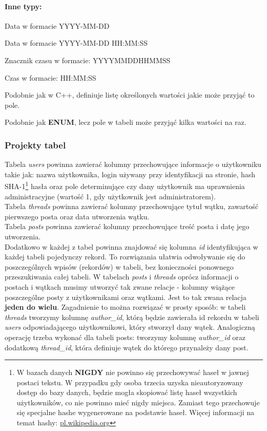 \documentclass[a4paper,10pt]{article}
\renewenvironment{description}[1][0pt]
	{\list{}{\labelwidth=0pt \leftmargin=#1
	\let\makelabel\descriptionlabel}}
	{\endlist}
\begin{document}
\paragraph{Inne typy:}
\begin{description}[5mm]
\item[DATE] Data w formacie YYYY-MM-DD
\item[DATETIME] Data w formacie YYYY-MM-DD HH:MM:SS
\item[TIMESTAMP] Znacznik czasu w formacie: YYYYMMDDHHMMSS
\item[TIME] Czas w formacie: HH:MM:SS
\item[ENUM] Podobnie jak w C++, definiuje listę określonych wartości jakie może przyjąć to pole.
\item[SET] Podobnie jak \textbf{ENUM}, lecz pole w tabeli może przyjąć kilka wartości na raz.
\end{description}

\subsubsection{Projekty tabel}
Tabela \textit{users} powinna zawierać kolumny przechowujące informacje o użytkowniku takie jak: nazwa użytkownika, login używany przy identyfikacji na stronie, hash SHA-1\footnote{W bazach danych \textbf{NIGDY} nie powinno się przechowywać haseł w jawnej postaci tekstu. W przypadku gdy osoba trzecia uzyska nieautoryzowany dostęp do bazy danych, będzie mogła skopiować listę haseł wszystkich użytkowników, co nie powinno mieć nigdy miejsca. Zamiast tego przechowuje się specjalne hashe wygenerowane na podstawie haseł. Więcej informacji na temat hashy: \href{http://pl.wikipedia.org/wiki/Funkcja_skrótu}{pl.wikipedia.org}} hasła oraz pole determinujące czy dany użytkownik ma uprawnienia administracyjne (wartość 1, gdy użytkownik jest administratorem). \\
Tabela \textit{threads} powinna zawierać kolumny przechowujące tytuł wątku, zawartość pierwszego posta oraz data utworzenia wątku. \\
Tabela \textit{posts} powinna zawierać kolumny przechowujące treść posta i datę jego utworzenia. \\
Dodatkowo w każdej z tabel powinna znajdować się kolumna \textit{id} identyfikująca w każdej tabeli pojedynczy rekord. To rozwiązania ułatwia odwoływanie się do poszczególnych wpisów (rekordów)  w tabeli, bez konieczności ponownego przeszukiwania całej tabeli.
W tabelach \textit{posts} i  \textit{threads} oprócz informacji o postach i wątkach musimy utworzyć tak zwane relacje - kolumny wiążące poszczególne posty z użytkownikami oraz wątkami. Jest to tak zwana relacja \textbf{jeden do wielu}. Zagadnienie to można rozwiązać w prosty sposób: w tabeli \textit{threads} tworzymy kolumnę \textit{author\_id}, którą będzie zawierała id rekordu w tabeli \textit{users} odpowiadającego użytkownikowi, który stworzył dany wątek. Analogiczną operację trzeba wykonać dla tabeli posts: tworzymy kolumnę \textit{author\_id} oraz dodatkową \textit{thread\_id}, która definiuje wątek do którego przynależy dany post.
\end{document}
